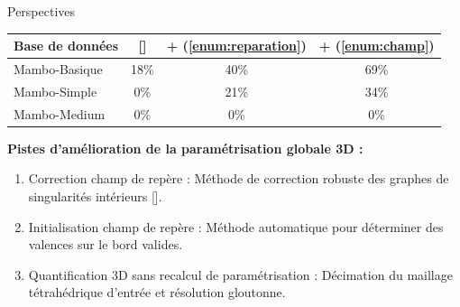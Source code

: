 \begin{frame}{Perspectives}
    \scriptsize
    \begin{table}
        \centering
        \begin{tabular}{|l|c|c|c|}
        \hline
        Base de données & [\cite{ray_practical_2016}] & + (\ref{enum:reparation}) & + (\ref{enum:champ}) \\
        \hline
        Mambo-Basique & 18\% & 40\% & 69\% \\
        \hline
        Mambo-Simple & 0\% & 21\% & 34\% \\
        \hline
        Mambo-Medium & 0\% & 0\% & 0\% \\
        \hline
        \end{tabular}
    \end{table}
    \small
    \textbf{Pistes d'amélioration de la paramétrisation globale 3D :}
    \begin{enumerate}
        \item Correction champ de repère : Méthode de correction robuste des graphes de singularités intérieurs [\cite{liu2023locally}].
        \item Initialisation champ de repère : Méthode automatique pour déterminer des valences sur le bord valides.
        \item Quantification 3D sans recalcul de paramétrisation : Décimation du maillage tétrahédrique d'entrée et résolution gloutonne.%
    \end{enumerate}
\end{frame}